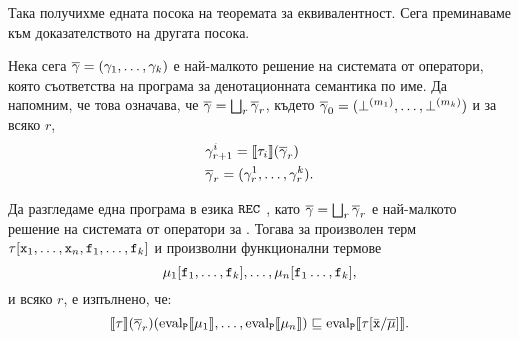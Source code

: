 Така получихме едната посока на теоремата за еквивалентност.
Сега преминаваме към доказателството на другата посока.

Нека сега $\overline{\gamma} = (\gamma_1,\dots,\gamma_k)$ е най-малкото решение на системата от оператори, която съответства на програма 
за денотационната семантика по име.
Да напомним, че това означава, че $\overline{\gamma} = \bigsqcup_r \overline{\gamma}_r$, 
където $\overline{\gamma}_0 = (\bot^{(m_1)},\dots,\bot^{(m_k)})$ и за всяко $r$,
\begin{align*}
  & \gamma^i_{r+1} = \llbracket{\tau_i}\rrbracket(\overline{\gamma}_r)\\
  & \overline{\gamma}_r = ( \gamma^1_r, \dots, \gamma^k_r).
\end{align*}



\begin{proposition}
  \label{pr:op-name-inclusion2}
  Да разгледаме една програма  в езика $\texttt{REC}\ $, като
  $\overline{\gamma} = \bigsqcup_r\overline{\gamma}_r$ е най-малкото решение на системата от оператори за .
  Тогава за произволен терм $\tau[\texttt{x}_1,\dots,\texttt{x}_n,\texttt{f}_1,\dots,\texttt{f}_k]$ и
  произволни функционални термове
  \[\mu_1[\texttt{f}_1,\dots,\texttt{f}_k],\dots,\mu_n[\texttt{f}_1\dots,\texttt{f}_k],\]
  и всяко $r$, е изпълнено, че:
  \[\llbracket{\tau}\rrbracket(\overline{\gamma}_r)(\text{eval}_{\texttt{P}}\llbracket{{\mu_1}}\rrbracket,\dots,\text{eval}_{\texttt{P}}\llbracket{{\mu_n}}\rrbracket) \sqsubseteq \text{eval}_{\texttt{P}}\llbracket{{\tau[\bar{\texttt{x}}/\overline{\mu}]}}\rrbracket.\]
\end{proposition}
